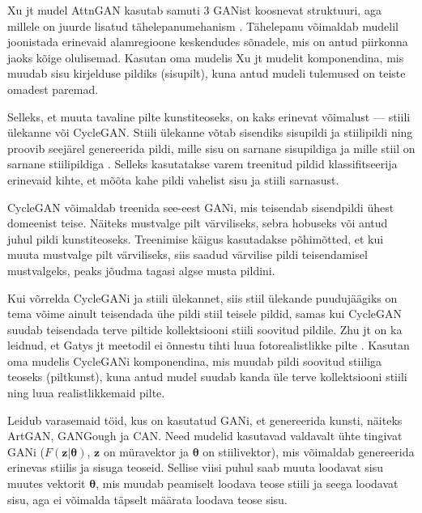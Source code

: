 \documentclass{vilgym}
\begin{document}
	Xu jt mudel AttnGAN kasutab samuti 3 GANist koosnevat struktuuri, aga millele on juurde lisatud tähelepanumehanism \parencite{attngan}. Tähelepanu võimaldab mudelil joonistada erinevaid alamregioone keskendudes sõnadele, mis on antud piirkonna jaoks kõige olulisemad. Kasutan oma mudelis Xu jt mudelit komponendina, mis muudab sisu kirjelduse pildiks (sisu\textrightarrow pilt), kuna antud mudeli tulemused on teiste omadest paremad. 

	Selleks, et muuta tavaline pilte kunstiteoseks, on kaks erinevat võimalust --- stiili ülekanne või CycleGAN. Stiili ülekanne võtab sisendiks sisupildi ja stiilipildi ning proovib seejärel genereerida pildi, mille sisu on sarnane sisupildiga ja mille stiil on sarnane stiilipildiga \parencite{styletransfer}.
	Selleks kasutatakse varem treenitud pildid klassifitseerija erinevaid kihte, et mõõta kahe pildi vahelist sisu ja stiili sarnasust. 

	CycleGAN võimaldab treenida see-eest GANi, mis teisendab sisendpildi ühest domeenist teise. Näiteks mustvalge pilt värviliseks, sebra hobuseks või antud juhul pildi kunstiteoseks. Treenimise käigus kasutadakse põhimõtted, et kui muuta mustvalge pilt värviliseks, siis saadud värvilise pildi teisendamisel mustvalgeks, peaks jõudma tagasi algse musta pildini. \parencite{cyclegan}

	Kui võrrelda CycleGANi ja stiili ülekannet, siis stiil ülekande puudujäägiks on tema võime ainult teisendada ühe pildi stiil teisele pildid, samas kui CycleGAN suudab teisendada terve piltide kollektsiooni stiili soovitud pildile. Zhu jt on ka leidnud, et Gatys jt meetodil ei õnnestu tihti luua fotorealistlikke pilte \parencite{cyclegan}. Kasutan oma mudelis CycleGANi komponendina, mis muudab pildi soovitud stiiliga teoseks (pilt\textrightarrow kunst), kuna antud mudel suudab kanda üle terve kollektsiooni stiili ning luua realistlikkemaid pilte.

	Leidub varasemaid töid, kus on kasutatud GANi, et genereerida kunsti, näiteks ArtGAN\parencite{artgan}, GANGough\parencite{gangough} ja CAN\parencite{can}. Need mudelid kasutavad valdavalt ühte tingivat GANi ($ F(\boldsymbol{z}|\boldsymbol{\theta}) $, $ \boldsymbol{z} $ on müravektor ja $ \boldsymbol{\theta} $ on stiilivektor), mis võimaldab genereerida erinevas stiilis ja sisuga teoseid. Sellise viisi puhul saab muuta loodavat sisu muutes vektorit $ \boldsymbol{\theta} $, mis muudab peamiselt loodava teose stiili ja seega loodavat sisu, aga ei võimalda täpselt määrata loodava teose sisu. 
\end{document}
